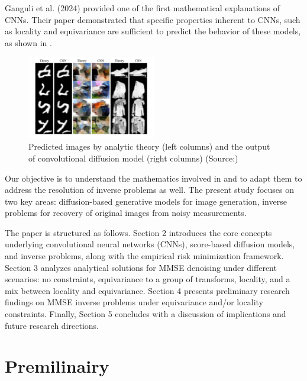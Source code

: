 \documentclass[a4paper,10pt]{article}
\begin{document}
Ganguli et al. (2024) \cite{kamb2024analytictheorycreativityconvolutional} provided one of the first mathematical explanations of CNNs. Their paper demonstrated that specific properties inherent to CNNs, such as locality and equivariance are sufficient to predict the behavior of these models, as shown in .
\begin{figure}[ht] %
    \centering
    \includegraphics[width=0.5\textwidth]{../images/introduction_Ganguli.png} %
    \caption{Predicted images by analytic theory (left columns) and the output of convolutional diffusion model (right columns) (Source:\cite{kamb2024analytictheorycreativityconvolutional})}
    \label{fig:introduction_im}
\end{figure}

Our objective is to understand the mathematics involved in \cite{kamb2024analytictheorycreativityconvolutional} and to adapt them to address the resolution of inverse problems as well. The present study focuses on two key areas: diffusion-based generative models for image generation, inverse problems for recovery of original images from noisy measurements.

The paper is structured as follows. Section 2 introduces the core concepts underlying convolutional neural networks (CNNs), score-based diffusion models, and inverse problems, along with the empirical risk minimization framework. Section 3 analyzes analytical solutions for MMSE denoising  under different scenarios: no constraints, equivariance to a group of transforms, locality, and a mix between locality and equivariance. Section 4 presents preliminary research findings on MMSE inverse problems under  equivariance and/or locality constraints. Finally, Section 5 concludes with a discussion of implications and future research directions.

\section{Premilinairy}
\end{document}
